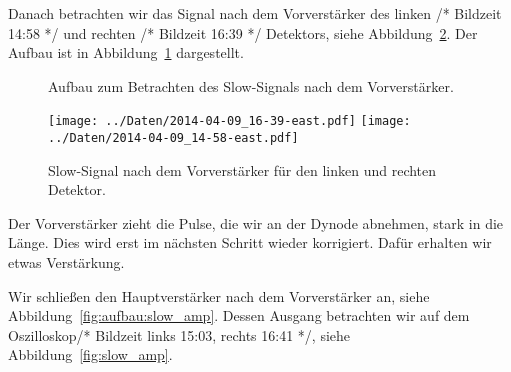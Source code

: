 Danach betrachten wir das Signal nach dem Vorverstärker des linken /* Bildzeit
14:58 */ und rechten /* Bildzeit 16:39 */ Detektors, siehe
Abbildung~\ref{fig:slow_pre_amp}. Der Aufbau ist in
Abbildung~\ref{fig:aufbau:slow_pre} dargestellt.

\begin{figure}[htbp]
    \centering
    \caption{%
        Aufbau zum Betrachten des Slow-Signals nach dem Vorverstärker.
    }
    \label{fig:aufbau:slow_pre}
\end{figure}

\begin{figure}[htbp]
    \centering
    \texttt{[image: ../Daten/2014-04-09\_16-39-east.pdf]}
    \hfill
    \texttt{[image: ../Daten/2014-04-09\_14-58-east.pdf]}
    \caption{%
        Slow-Signal nach dem Vorverstärker für den linken und rechten Detektor.
    }
    \label{fig:slow_pre_amp}
\end{figure}

Der Vorverstärker zieht die Pulse, die wir an der Dynode abnehmen, stark in die
Länge. Dies wird erst im nächsten Schritt wieder korrigiert. Dafür erhalten wir
etwas Verstärkung.

Wir schließen den Hauptverstärker nach dem Vorverstärker an, siehe
Abbildung~\ref{fig:aufbau:slow_amp}. Dessen Ausgang betrachten wir auf dem
Oszilloskop/* Bildzeit links 15:03, rechts 16:41 */, siehe
Abbildung~\ref{fig:slow_amp}.

